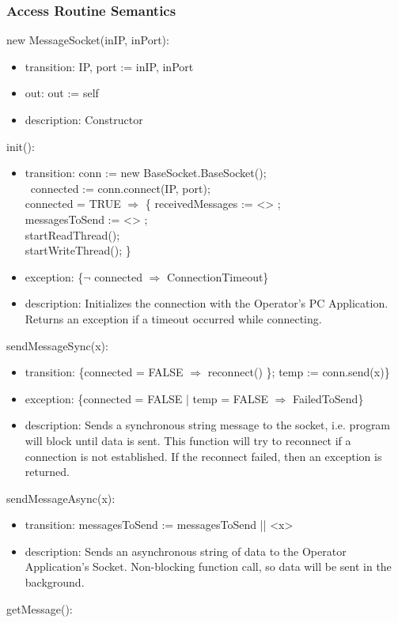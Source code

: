 \documentclass[12pt, titlepage]{article}
\begin{document}
\subsubsection{Access Routine Semantics}
\noindent new MessageSocket(inIP, inPort):
\begin{itemize}
\item transition: IP, port := inIP, inPort
\item out:  out := self
\item description: Constructor
\end{itemize}
\noindent init():
\begin{itemize}
\item transition: conn := new BaseSocket.BaseSocket(); \\ \ connected := conn.connect(IP, port); \\ connected = TRUE $\Rightarrow$ \{  receivedMessages := <> ; \\ messagesToSend := <> ;\\ startReadThread(); \\ startWriteThread(); \}
\item exception:  \{$\neg$ connected  $\Rightarrow$ ConnectionTimeout\}
\item description: Initializes the connection with the Operator's PC Application. Returns an exception if a timeout occurred while connecting.
\end{itemize}
\noindent sendMessageSync(x):
\begin{itemize}
\item transition: \{connected = FALSE $\Rightarrow$ reconnect() \}; temp := conn.send(x)\}
\item exception: \{connected = FALSE | temp = FALSE $\Rightarrow$ FailedToSend\}
\item description: Sends a synchronous string message to the socket, i.e. program will block until data is sent. This function will try to reconnect if a connection is not established. If the reconnect failed, then an exception is returned.
\end{itemize}
\noindent sendMessageAsync(x):
\begin{itemize}
\item transition: messagesToSend := messagesToSend || <x>
\item description: Sends an asynchronous string of data to the Operator Application's Socket. Non-blocking function call, so data will be sent in the background.
\end{itemize}
\noindent getMessage():
\end{document}
